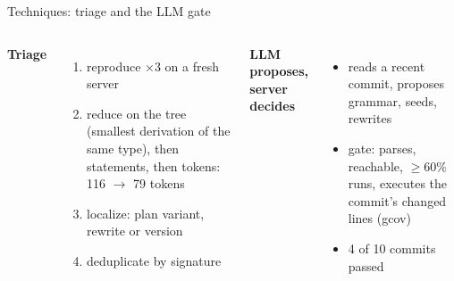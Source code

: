 \documentclass[aspectratio=169,10pt]{beamer}
\begin{document}
\begin{frame}{Techniques: triage and the LLM gate}
\small
\begin{columns}[T]
\textbf{Triage}
\begin{enumerate}
  \item reproduce $\times3$ on a fresh server
  \item reduce on the tree (smallest derivation of the same type), then statements, then tokens: 116 $\rightarrow$ 79 tokens
  \item localize: plan variant, rewrite or version
  \item deduplicate by signature
\end{enumerate}
\textbf{LLM proposes, server decides}
\begin{itemize}
  \item reads a recent commit, proposes grammar, seeds, rewrites
  \item gate: parses, reachable, $\geq60\%$ runs, executes the commit's \alert{changed lines} (gcov)
  \item 4 of 10 commits passed
\end{itemize}
\end{columns}
\end{frame}
\end{document}
